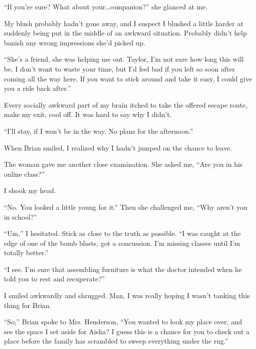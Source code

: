 ``If you're sure?  What about your\ldots companion?'' she glanced at me.



My blush probably hadn't gone away, and I suspect I blushed a little harder at suddenly being put in the middle of an awkward situation.  Probably didn't help banish any wrong impressions she'd picked up.



``She's a friend, she was helping me out.  Taylor, I'm not sure how long this will be.  I don't want to waste your time, but I'd feel bad if you left so soon after coming all the way here.  If you want to stick around and take it easy, I could give you a ride back after.''



Every socially awkward part of my brain itched to take the offered escape route, make my exit, cool off.  It was hard to say why I didn't.



``I'll stay, if I won't be in the way.  No plans for the afternoon.''



When Brian smiled, I realized why I hadn't jumped on the chance to leave.



The woman gave me another close examination.  She asked me, ``Are you in his online class?''



I shook my head.



``No.  You looked a little young for it.''  Then she challenged me, ``Why aren't you in school?''



``Um,'' I hesitated.  Stick as close to the truth as possible.  ``I was caught at the edge of one of the bomb blasts, got a concussion.  I'm missing classes until I'm totally better.''



``I see.  I'm sure that assembling furniture is what the doctor intended when he told you to rest and recuperate?''



I smiled awkwardly and shrugged.  Man, I was really hoping I wasn't tanking this thing for Brian.



``So,'' Brian spoke to Mrs. Henderson,  ``You wanted to look my place over, and see the space I set aside for Aisha?  I guess this is a chance for you to check out a place before the family has scrambled to sweep everything under the rug.''



